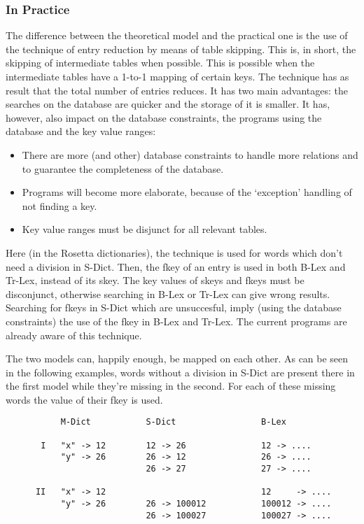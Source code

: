 \subsubsection{In Practice}

The difference between the theoretical model and the practical one is the use 
of the technique of entry reduction by means of table skipping. This is, in 
short, the skipping of intermediate tables when possible. This is possible when 
the intermediate tables have a 1-to-1 mapping of certain keys. The technique has
as result that the total number of entries reduces. It has two main advantages: 
the searches on the database are quicker and the storage of it is smaller. It 
has, however, also impact on the database constraints, the programs using the 
database and the key value ranges:

\begin{itemize}
   \item There are more (and other) database constraints to handle more 
         relations and to guarantee the completeness of the database.
   \item Programs will become more elaborate, because of the `exception' 
         handling of not finding a key. 
   \item Key value ranges must be disjunct for all relevant tables.
\end{itemize}
      
Here (in the Rosetta dictionaries), the technique is used for words which don't
need a division in S-Dict. Then, the fkey of an entry is used in both B-Lex and 
Tr-Lex, instead of its skey. The key values of skeys and fkeys must be 
disconjunct, otherwise searching in B-Lex or Tr-Lex can give wrong results. 
Searching for fkeys in S-Dict which are unsuccesful, imply (using the database 
constraints) the use of the fkey in B-Lex and Tr-Lex. The current programs are 
already aware of this technique.

The two models can, happily enough, be mapped on each other. As can be seen in 
the following examples, words without a division in S-Dict are present there in 
the first model while they're missing in the second. For each of these missing 
words the value of their fkey is used.

\begin{verbatim}
           M-Dict           S-Dict                 B-Lex
      
       I   "x" -> 12        12 -> 26               12 -> ....
           "y" -> 26        26 -> 12               26 -> ....
                            26 -> 27               27 -> ....
      
      II   "x" -> 12                               12     -> ....
           "y" -> 26        26 -> 100012           100012 -> ....
                            26 -> 100027           100027 -> ....
\end{verbatim}


